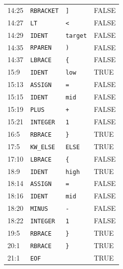 \documentclass[11pt,a4paper]{article}
\newcommand{\token}[1]{\texttt{#1}}
\newcommand{\codeinline}[1]{\texttt{#1}}
\begin{document}
\begin{longtable}{L{23mm} L{42mm} L{47mm} L{32mm}}
14:25 & \token{RBRACKET} & \codeinline{]} & FALSE \\
14:27 & \token{LT} & \codeinline{<} & FALSE \\
14:29 & \token{IDENT} & \codeinline{target} & FALSE \\
14:35 & \token{RPAREN} & \codeinline{)} & FALSE \\
14:37 & \token{LBRACE} & \codeinline{\{} & FALSE \\
15:9 & \token{IDENT} & \codeinline{low} & TRUE \\
15:13 & \token{ASSIGN} & \codeinline{=} & FALSE \\
15:15 & \token{IDENT} & \codeinline{mid} & FALSE \\
15:19 & \token{PLUS} & \codeinline{+} & FALSE \\
15:21 & \token{INTEGER} & \codeinline{1} & FALSE \\
16:5 & \token{RBRACE} & \codeinline{\}} & TRUE \\
17:5 & \token{KW\_ELSE} & \codeinline{ELSE} & TRUE \\
17:10 & \token{LBRACE} & \codeinline{\{} & FALSE \\
18:9 & \token{IDENT} & \codeinline{high} & TRUE \\
18:14 & \token{ASSIGN} & \codeinline{=} & FALSE \\
18:16 & \token{IDENT} & \codeinline{mid} & FALSE \\
18:20 & \token{MINUS} & \codeinline{-} & FALSE \\
18:22 & \token{INTEGER} & \codeinline{1} & FALSE \\
19:5 & \token{RBRACE} & \codeinline{\}} & TRUE \\
20:1 & \token{RBRACE} & \codeinline{\}} & TRUE \\
21:1 & \token{EOF} & \codeinline{} & TRUE \\
\end{longtable}
\endgroup


\end{document}

